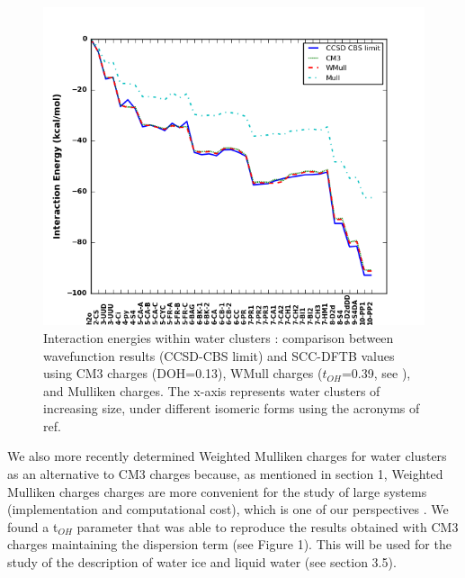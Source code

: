 \documentclass[]{interact}
\theoremstyle{plain}%
\theoremstyle{definition}
\theoremstyle{remark}
\begin{document}
	
			 \begin{figure}[!ht]
		  \begin{center}
\includegraphics[width=14cm]{ener_Wn1.png}
  \end{center}
\caption{Interaction energies within water clusters : comparison between wavefunction results (CCSD-CBS limit) \cite{bench_nrj_Wn_JPCA2011} and SCC-DFTB values using CM3 charges (DOH=0.13)\cite{SimonPCCP2012},  WMull charges ($t_{OH}$=0.39, see \cite{Michoulier18b}), and Mulliken charges. The x-axis represents water clusters of increasing size, under different isomeric forms using the acronyms of ref.  \cite{bench_nrj_Wn_JPCA2011} }
\label{fig:nrj_wn}
\end{figure}


		We also  more recently determined  Weighted Mulliken charges for water clusters \cite{Michoulier18b} as an alternative to CM3 charges because, as mentioned in section 1, Weighted Mulliken charges  charges are more convenient for the study of large systems (implementation and computational cost), which is one of our perspectives . We found a t$_{OH}$ parameter that was able to reproduce the results obtained with CM3 charges maintaining the dispersion term (see Figure 1). This will be used for the study of the description of water ice and liquid water (see section 3.5).
				
\end{document}
